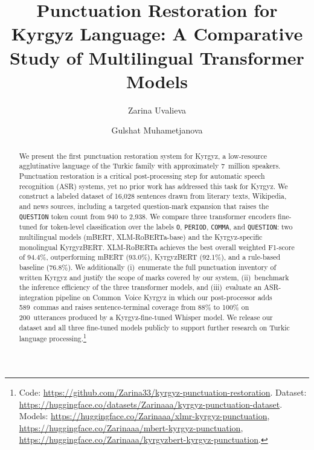 \documentclass[manuscript, review]{acmart}
\begin{document}
\title{Punctuation Restoration for Kyrgyz Language: A Comparative Study of Multilingual Transformer Models}

\author{Zarina Uvalieva}

\author{Gulshat Muhametjanova}

\begin{abstract}
We present the first punctuation restoration system for Kyrgyz, a low-resource agglutinative language of the Turkic family with approximately 7~million speakers. Punctuation restoration is a critical post-processing step for automatic speech recognition (ASR) systems, yet no prior work has addressed this task for Kyrgyz. We construct a labeled dataset of 16{,}028 sentences drawn from literary texts, Wikipedia, and news sources, including a targeted question-mark expansion that raises the \texttt{QUESTION} token count from 940 to 2{,}938. We compare three transformer encoders fine-tuned for token-level classification over the labels \texttt{O}, \texttt{PERIOD}, \texttt{COMMA}, and \texttt{QUESTION}: two multilingual models (mBERT, XLM-RoBERTa-base) and the Kyrgyz-specific monolingual KyrgyzBERT. XLM-RoBERTa achieves the best overall weighted F1-score of 94.4\%, outperforming mBERT (93.0\%), KyrgyzBERT (92.1\%), and a rule-based baseline (76.8\%). We additionally (i)~enumerate the full punctuation inventory of written Kyrgyz and justify the scope of marks covered by our system, (ii)~benchmark the inference efficiency of the three transformer models, and (iii)~evaluate an ASR-integration pipeline on Common~Voice Kyrgyz in which our post-processor adds 589~commas and raises sentence-terminal coverage from 88\% to 100\% on 200~utterances produced by a Kyrgyz-fine-tuned Whisper model. We release our dataset and all three fine-tuned models publicly to support further research on Turkic language processing.\footnote{Code: \url{https://github.com/Zarina33/kyrgyz-punctuation-restoration}. Dataset: \url{https://huggingface.co/datasets/Zarinaaa/kyrgyz-punctuation-dataset}. Models: \url{https://huggingface.co/Zarinaaa/xlmr-kyrgyz-punctuation}, \url{https://huggingface.co/Zarinaaa/mbert-kyrgyz-punctuation}, \url{https://huggingface.co/Zarinaaa/kyrgyzbert-kyrgyz-punctuation}.}
\end{abstract}
\end{document}
